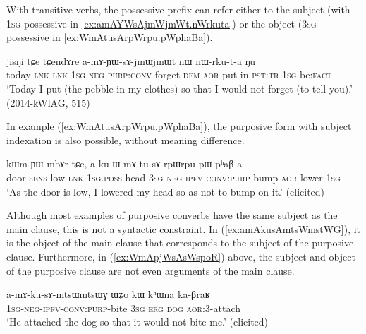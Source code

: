 With transitive verbs, the possessive prefix can refer either to the subject (with \textsc{1sg} possessive  in \ref{ex:amAYWsAjmWjmWt.nWrkuta}) or the object (\textsc{3sg} possessive  in \ref{ex:WmAtusArpWrpu.pWphaBa}).

\begin{exe}
\ex \label{ex:amAYWsAjmWjmWt.nWrkuta}
\gll jisŋi tɕe tɕendɤre a-mɤ-ɲɯ-sɤ-jmɯ\redp{}jmɯt nɯ nɯ-rku-t-a ŋu \\
today \textsc{lnk} \textsc{lnk} \textsc{1sg}-\textsc{neg}-\textsc{purp}:\textsc{conv}-forget \textsc{dem} \textsc{aor}-put-in-\textsc{pst}:\textsc{tr}-\textsc{1sg} be:\textsc{fact} \\
\glt `Today I put (the pebble in my clothes) so that I would not forget (to tell you).' (2014-kWlAG, 515)
\end{exe}

In example (\ref{ex:WmAtusArpWrpu.pWphaBa}), the purposive form  with subject indexation is also possible, without meaning difference.

\begin{exe}
\ex \label{ex:WmAtusArpWrpu.pWphaBa}
\gll kɯm ɲɯ-mbɤr tɕe, a-ku ɯ-mɤ-tu-sɤ-rpɯ\redp{}rpu pɯ-pʰaβ-a \\
door \textsc{sens}-low \textsc{lnk} \textsc{1sg}.\textsc{poss}-head \textsc{3sg}-\textsc{neg}-\textsc{ipfv}-\textsc{conv}:\textsc{purp}-bump \textsc{aor}-lower-\textsc{1sg}\\
\glt `As the door is low, I lowered my head so as not to bump on it.' (elicited)
\end{exe}

Although most examples of purposive converbs have the same subject as the main clause, this is not a syntactic constraint. In (\ref{ex:amAkusAmtsWmstWG}), it is the object of the main clause  that corresponds to the subject of the purposive clause. Furthermore, in (\ref{ex:WmApjWsAsWspoR}) above, the subject and object of the purposive clause are not even arguments of the main clause.

\begin{exe}
\ex \label{ex:amAkusAmtsWmstWG}
\gll  a-mɤ-ku-sɤ-mtsɯ\redp{}mtsɯɣ ɯʑo kɯ kʰɯna ka-βraʁ \\
\textsc{1sg}-\textsc{neg}-\textsc{ipfv}-\textsc{conv}:\textsc{purp}-bite \textsc{3sg} \textsc{erg} \textsc{dog} \textsc{aor}:3\flobv{}-attach \\
\glt `He attached the dog so that it would not bite me.' (elicited)
\end{exe}

